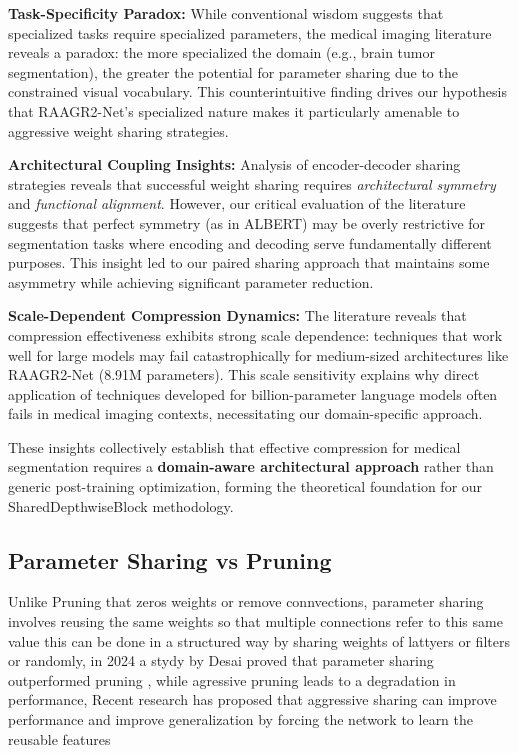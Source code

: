 \documentclass[12pt,a4paper]{article}
\begin{document}
\textbf{Task-Specificity Paradox:} While conventional wisdom suggests that specialized tasks require specialized parameters, the medical imaging literature reveals a paradox: the more specialized the domain (e.g., brain tumor segmentation), the greater the potential for parameter sharing due to the constrained visual vocabulary. This counterintuitive finding drives our hypothesis that RAAGR2-Net's specialized nature makes it particularly amenable to aggressive weight sharing strategies.

\textbf{Architectural Coupling Insights:} Analysis of encoder-decoder sharing strategies reveals that successful weight sharing requires \textit{architectural symmetry} and \textit{functional alignment}. However, our critical evaluation of the literature suggests that perfect symmetry (as in ALBERT) may be overly restrictive for segmentation tasks where encoding and decoding serve fundamentally different purposes. This insight led to our paired sharing approach that maintains some asymmetry while achieving significant parameter reduction.

\textbf{Scale-Dependent Compression Dynamics:} The literature reveals that compression effectiveness exhibits strong scale dependence: techniques that work well for large models may fail catastrophically for medium-sized architectures like RAAGR2-Net (8.91M parameters). This scale sensitivity explains why direct application of techniques developed for billion-parameter language models often fails in medical imaging contexts, necessitating our domain-specific approach.

These insights collectively establish that effective compression for medical segmentation requires a \textbf{domain-aware architectural approach} rather than generic post-training optimization, forming the theoretical foundation for our SharedDepthwiseBlock methodology.

\subsection{Parameter Sharing vs Pruning}
Unlike Pruning that zeros weights or remove connvections, parameter sharing involves reusing the same weights so that multiple connections refer to this same value this can be done in a structured way by sharing weights of lattyers or filters or randomly, in 2024 a stydy by Desai proved that parameter sharing outperformed pruning \cite{desai2024}, while agressive pruning leads to a degradation in performance, Recent research has proposed that aggressive sharing can improve performance and improve generalization by forcing the network to learn the reusable features  \cite{kim2021}
\end{document}
